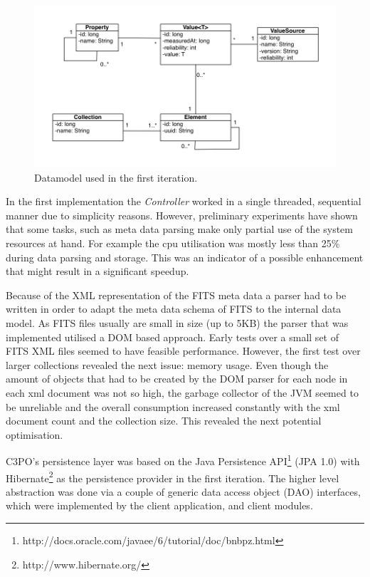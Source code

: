 \begin{figure}[t]
\begin{center}
\includegraphics[width=5in]{figures/architecture/old_datamodel.png}
\caption{Datamodel used in the first iteration.}
\label{fig:old_datamodel}
\end{center}
\end{figure}

In the first implementation the \textit{Controller} worked in a single threaded, sequential manner due to simplicity reasons. However, preliminary experiments have shown that some tasks, such as meta data parsing make only partial use of the system resources at hand. For example the cpu utilisation was mostly less than 25\% during data parsing and storage. This was an indicator of a possible enhancement that might result in a significant speedup.

Because of the XML representation of the FITS meta data a parser had to be written in order to adapt the meta data schema of FITS to the internal data model. As FITS files usually are small in size (up to 5KB) the parser that was implemented utilised a DOM based approach. Early tests over a small set of FITS XML files seemed to have feasible performance. However, the first test over larger collections revealed the next issue: memory usage. Even though the amount of objects that had to be created by the DOM parser for each node in each xml document was not so high, the garbage collector of the JVM seemed to be unreliable and the overall consumption increased constantly with the xml document count and the collection size. This revealed the next potential optimisation.

C3PO's persistence layer was based on the Java Persistence API\footnote{http://docs.oracle.com/javaee/6/tutorial/doc/bnbpz.html} (JPA 1.0) with Hibernate\footnote{http://www.hibernate.org/} as the persistence provider in the first iteration. The higher level abstraction was done via a couple of generic data access object (DAO) interfaces, which were implemented by the client application, and client modules.

